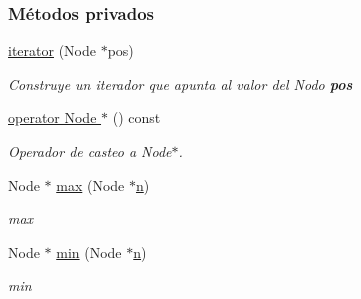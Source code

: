 \subsubsection*{Métodos privados}
\begin{DoxyCompactItemize}
\item 
\hyperlink{classaed2_1_1map_1_1iterator_ab0ea21abcb32b6d5a72cf341b9029838_ab0ea21abcb32b6d5a72cf341b9029838}{iterator} (Node $\ast$pos)
\begin{DoxyCompactList}\small\item\em Construye un iterador que apunta al valor del Nodo {\bfseries pos} \end{DoxyCompactList}\item 
\hyperlink{classaed2_1_1map_1_1iterator_a7fe2cdc033cd899dc9fd1da08ac3b39e_a7fe2cdc033cd899dc9fd1da08ac3b39e}{operator Node $\ast$} () const 
\begin{DoxyCompactList}\small\item\em Operador de casteo a Node$\ast$. \end{DoxyCompactList}\item 
Node $\ast$ \hyperlink{classaed2_1_1map_1_1iterator_a15d8ac3fe9294cbdf769f3f3aeae4390_a15d8ac3fe9294cbdf769f3f3aeae4390}{max} (Node $\ast$\hyperlink{classaed2_1_1map_1_1iterator_adf8633ef71bb6c1fc01c0abe8728fd93_adf8633ef71bb6c1fc01c0abe8728fd93}{n})
\begin{DoxyCompactList}\small\item\em max \end{DoxyCompactList}\item 
Node $\ast$ \hyperlink{classaed2_1_1map_1_1iterator_a2af3a44486e6d6f9503ed5a543363e64_a2af3a44486e6d6f9503ed5a543363e64}{min} (Node $\ast$\hyperlink{classaed2_1_1map_1_1iterator_adf8633ef71bb6c1fc01c0abe8728fd93_adf8633ef71bb6c1fc01c0abe8728fd93}{n})
\begin{DoxyCompactList}\small\item\em min \end{DoxyCompactList}\end{DoxyCompactItemize}
